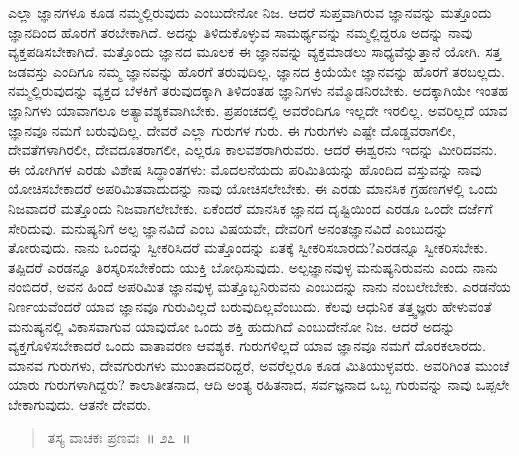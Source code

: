 \vspace{-0.4cm}


ಎಲ್ಲಾ ಜ್ಞಾನಗಳೂ ಕೂಡ ನಮ್ಮಲ್ಲಿರುವುದು ಎಂಬುದೇನೋ ನಿಜ. ಆದರೆ ಸುಪ್ತವಾಗಿರುವ ಜ್ಞಾನವನ್ನು ಮತ್ತೊಂದು ಜ್ಞಾನದಿಂದ ಹೊರಗೆ ತರಬೇಕಾಗಿದೆ. ಅದನ್ನು ತಿಳಿದುಕೊಳ್ಳುವ ಸಾಮರ್ಥ್ಯವನ್ನು ನಮ್ಮಲ್ಲಿದ್ದರೂ ಅದನ್ನು ನಾವು ವ್ಯಕ್ತಪಡಿಸಬೇಕಾಗಿದೆ. ಮತ್ತೊಂದು ಜ್ಞಾನದ ಮೂಲಕ ಈ ಜ್ಞಾನವನ್ನು ವ್ಯಕ್ತಮಾಡಲು ಸಾಧ್ಯವೆನ್ನುತ್ತಾನೆ ಯೋಗಿ. ಸತ್ತ ಜಡವಸ್ತು ಎಂದಿಗೂ ನಮ್ಮ ಜ್ಞಾನವನ್ನು ಹೊರಗೆ ತರುವುದಿಲ್ಲ. ಜ್ಞಾನದ ಕ್ರಿಯೆಯೇ ಜ್ಞಾನವನ್ನು ಹೊರಗೆ ತರಬಲ್ಲದು. ನಮ್ಮಲ್ಲಿರುವುದನ್ನು ವ್ಯಕ್ತದ ಬೆಳಕಿಗೆ ತರುವುದಕ್ಕಾಗಿ ತಿಳಿದಂತಹ ಜ್ಞಾನಿಗಳು ನಮ್ಮೊಡನಿರಬೇಕು. ಅದಕ್ಕಾಗಿಯೇ ಇಂತಹ ಜ್ಞಾನಿಗಳು ಯಾವಾಗಲೂ ಅತ್ಯಾವಶ್ಯಕವಾಗಿಬೇಕು. ಪ್ರಪಂಚದಲ್ಲಿ ಅವರೆಂದಿಗೂ ಇಲ್ಲದೇ ಇರಲಿಲ್ಲ. ಅವರಿಲ್ಲದೆ ಯಾವ ಜ್ಞಾನವೂ ನಮಗೆ ಬರುವುದಿಲ್ಲ. ದೇವರೆ ಎಲ್ಲಾ ಗುರುಗಳ ಗುರು. ಈ ಗುರುಗಳು ಎಷ್ಟೇ ದೊಡ್ಡವರಾಗಲೀ, ದೇವತೆಗಳಾಗಿರಲೀ, ದೇವದೂತರಾಗಲೀ, ಎಲ್ಲರೂ ಕಾಲವಶರಾಗಿರುವರು. ಆದರೆ ಈಶ್ವರನು ಇದನ್ನು ಮೀರಿದವನು. ಈ ಯೋಗಿಗಳ ಎರಡು ವಿಶೇಷ ಸಿದ್ಧಾಂತಗಳು: ಮೊದಲನೆಯದು ಪರಿಮಿತಿಯನ್ನು ಹೊಂದಿದ ವಸ್ತುವನ್ನು ನಾವು ಯೋಚಿಸಬೇಕಾದರೆ ಅಪರಿಮಿತವಾದುದನ್ನು ನಾವು ಯೋಚಿಸಲೇಬೇಕು. ಈ ಎರಡು ಮಾನಸಿಕ ಗ್ರಹಣಗಳಲ್ಲಿ ಒಂದು ನಿಜವಾದರೆ ಮತ್ತೊಂದು ನಿಜವಾಗಲೇಬೇಕು. ಏಕೆಂದರೆ ಮಾನಸಿಕ ಜ್ಞಾನದ ದೃಷ್ಟಿಯಿಂದ ಎರಡೂ ಒಂದೇ ದರ್ಜೆಗೆ ಸೇರಿದುವು. ಮನುಷ್ಯನಿಗೆ ಅಲ್ಪ ಜ್ಞಾನವಿದೆ ಎಂಬ ವಿಷಯವೇ, ದೇವರಿಗೆ ಅನಂತಜ್ಞಾನವಿದೆ ಎಂಬುದನ್ನು ತೋರುವುದು. ನಾನು ಒಂದನ್ನು ಸ್ವೀಕರಿಸಿದರೆ ಮತ್ತೊಂದನ್ನು ಏತಕ್ಕೆ ಸ್ವೀಕರಿಸಬಾರದು?\break ಎರಡನ್ನೂ ಸ್ವೀಕರಿಸಬೇಕು. ತಪ್ಪಿದರೆ ಎರಡನ್ನೂ ತಿರಸ್ಕರಿಸಬೇಕೆಂದು ಯುಕ್ತಿ ಬೋಧಿಸುವುದು. ಅಲ್ಪಜ್ಞಾನವುಳ್ಳ ಮನುಷ್ಯನಿರುವನು ಎಂದು ನಾನು ನಂಬಿದರೆ, ಅವನ ಹಿಂದೆ ಅಪರಿಮಿತ ಜ್ಞಾನವುಳ್ಳ ಮತ್ತೊಬ್ಬನಿರುವನು ಎಂಬುದನ್ನು ನಾನು ನಂಬಲೇಬೇಕು. ಎರಡನೆಯ ನಿರ್ಣಯವೆಂದರೆ ಯಾವ ಜ್ಞಾನವೂ ಗುರುವಿಲ್ಲದೆ ಬರುವುದಿಲ್ಲವೆಂಬುದು. ಕೆಲವು ಆಧುನಿಕ ತತ್ತ್ವಜ್ಞರು ಹೇಳುವಂತೆ ಮನುಷ್ಯನಲ್ಲಿ ವಿಕಾಸವಾಗುವ ಯಾವುದೋ ಒಂದು ಶಕ್ತಿ ಹುದುಗಿದೆ ಎಂಬುದೇನೋ ನಿಜ. ಆದರೆ ಅದನ್ನು ವ್ಯಕ್ತಗೊಳಿಸಬೇಕಾದರೆ ಒಂದು ವಾತಾವರಣ ಆವಶ್ಯಕ. ಗುರುಗಳಿಲ್ಲದೆ ಯಾವ ಜ್ಞಾನವೂ ನಮಗೆ ದೊರಕಲಾರದು. ಮಾನವ ಗುರುಗಳು, ದೇವಗುರುಗಳು ಮುಂತಾದವರಿದ್ದರೆ, ಅವರೆಲ್ಲರೂ ಕೂಡ ಮಿತಿಯುಳ್ಳವರು. ಅವರಿಗಿಂತ ಮುಂಚೆ ಯಾರು ಗುರುಗಳಾಗಿದ್ದರು? ಕಾಲಾತೀತನಾದ, ಆದಿ ಅಂತ್ಯ ರಹಿತನಾದ, ಸರ್ವಜ್ಞನಾದ ಒಬ್ಬ ಗುರುವನ್ನು ನಾವು ಒಪ್ಪಲೇ ಬೇಕಾಗುವುದು. ಆತನೇ ದೇವರು. 

\vspace{-0.35cm}

\begin{verse}
ತಸ್ಯ ವಾಚಕಃ ಪ್ರಣವಃ~॥ ೨೭~॥
\end{verse}

\vspace{-0.3cm}


\vspace{0.2cm}

